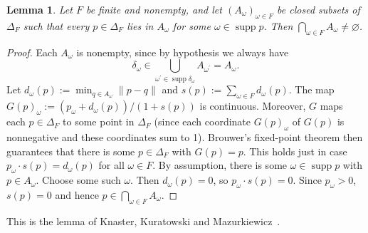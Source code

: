 \documentclass[11pt]{article}
\newtheorem{lemma}[theorem]{Lemma}
\theoremstyle{definition}
\newcommand{\supp}{\operatorname{supp}}
\begin{document}
\begin{lemma}\label{lem:kkm}
Let $F$ be finite and nonempty, and let $(A_\omega)_{\omega\in F}$ be closed subsets of $\Delta_F$ such that every $p\in\Delta_F$ lies in $A_\omega$ for some $\omega\in\supp p$. Then $\bigcap_{\omega\in F}A_\omega\ne\varnothing$.
\end{lemma}
\begin{proof}
Each $A_\omega$ is nonempty, since by hypothesis we always have 
\[
\delta_\omega\in\bigcup_{\omega^\prime\in\supp \delta_\omega}A_{\omega^\prime}=A_\omega.
\]
Let $d_\omega(p):=\min_{q\in A_\omega}\lVert p-q \rVert$ and $s(p):=\sum_{\omega\in F} d_\omega(p)$. The map $G(p)_\omega:=(p_\omega+d_\omega(p))/(1+s(p))$ is continuous. Moreover, $G$ maps each $p\in\Delta_F$ to some point in $\Delta_F$ (since each coordinate $G(p)_\omega$ of $G(p)$ is nonnegative and these coordinates sum to 1). Brouwer's fixed-point theorem then guarantees that there is some $p\in\Delta_F$ with $G(p)=p$. This holds just in case $p_\omega\cdot s(p)=d_\omega(p)$ for all $\omega\in F$. By assumption, there is some $\omega\in\supp p$ with $p\in A_\omega$. Choose some such $\omega$. Then $d_\omega(p)=0$, so $p_\omega\cdot s(p)=0$. Since $p_\omega>0$, $s(p)=0$ and hence $p\in\bigcap_{\omega\in F}A_\omega$.
\end{proof}

This is the lemma of Knaster, Kuratowski and Mazurkiewicz~\cite{KKM}.
\end{document}
